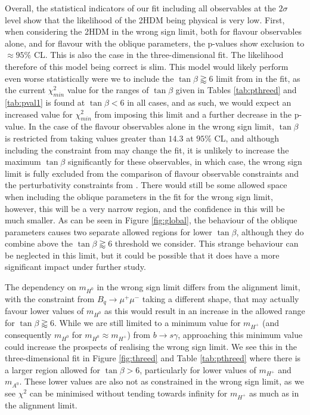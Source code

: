 \documentclass[a4paper,12pt]{article}
\begin{document}
Overall, the statistical indicators of our fit including all observables at the $2\sigma$ level show that the likelihood of the 2HDM being physical is very low. 
First, when considering the 2HDM in the wrong sign limit, both for flavour observables alone, and for flavour with the oblique parameters, the p-values show exclusion to $\approx95\%$ CL. 
This is also the case in the three-dimensional fit. 
The likelihood therefore of this model being correct is slim. 
This model would likely perform even worse statistically were we to include the $\tan\beta\gtrapprox6$ limit from \cite{oliver} in the fit, as the current $\chi^2_{min}$ value for the ranges of $\tan\beta$ given in Tables \ref{tab:pthreed} and \ref{tab:pval1} is found at $\tan\beta<6$ in all cases, and as such, we would expect an increased value for $\chi^2_{min}$ from imposing this limit and a further decrease in the p-value. 
In the case of the flavour observables alone in the wrong sign limit, $\tan\beta$ is restricted from taking values greater than $14.3$ at $95\%$ CL, and although including the constraint from \cite{oliver} may change the fit, it is unlikely to increase the maximum $\tan\beta$ significantly for these observables, in which case, the wrong sign limit is fully excluded from the comparison of flavour observable constraints and the perturbativity constraints from \cite{oliver}.
There would still be some allowed space when including the oblique parameters in the fit for the wrong sign limit, however, this will be a very narrow region, and the confidence in this will be much smaller.
As can be seen in Figure \ref{fig:global}, the behaviour of the oblique parameters causes two separate allowed regions for lower $\tan\beta$, although they do combine above the $\tan\beta\gtrapprox6$ threshold we consider. 
This strange behaviour can be neglected in this limit, but it could be possible that it does have a more significant impact under further study.

The dependency on $m_{H^0}$ in the wrong sign limit differs from the alignment limit, with the constraint from $B_q\to\mu^+\mu^-$ taking a different shape, that may actually favour lower values of $m_{H^0}$ as this would result in an increase in the allowed range for $\tan\beta\gtrapprox6$.
While we are still limited to a minimum value for $m_{H^+}$ (and consequently $m_{H^0}$ for $m_{H^0}\approx m_{H^+}$) from $b\to s\gamma$, approaching this minimum value could increase the prospects of realising the wrong sign limit. 
We see this in the three-dimensional fit in Figure \ref{fig:threed} and Table \ref{tab:pthreed} where there is a larger region allowed for $\tan\beta>6$, particularly for lower values of $m_{H^+}$ and $m_{A^0}$. 
These lower values are also not as constrained in the wrong sign limit, as we see $\chi^2$ can be minimised without tending towards infinity for $m_{H^+}$ as much as in the alignment limit. 
\end{document}
